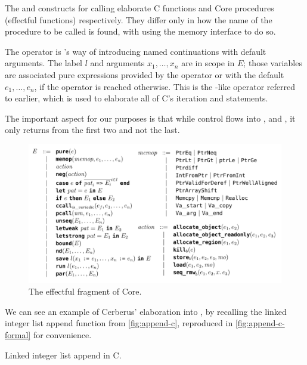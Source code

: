 The  and  constructs for calling %
elaborate C functions and Core procedures (effectful functions) respectively.
They differ only in how the name of the procedure to be called is found, with
 using the memory interface to do so. %

The  operator is 's way of introducing named %
continuations with default arguments. The label $l$ and arguments $x_1, \ldots,
x_n$ are in scope in $E$; those variables are associated pure expressions
provided by the  operator or with the default $e_1, \ldots, %
e_n$, if the operator is reached otherwise. This is the -like
operator referred to earlier, which is used to elaborate all of C's iteration
and  statements.

The important aspect for our purposes is that while control flows into
,  and , it %
only returns from the first two and not the last.

\begin{figure}[tp]
    \ContinuedFloat{}
    \includegraphics{figures/effectful-core.png}
    \caption{The effectful fragment of Core.}\label{fig:effectful-core-grammar}
\end{figure}

We can see an example of Cerberus' elaboration into , by recalling the
linked integer list append function from \cref{fig:append-c}, reproduced
in \cref{fig:append-c-formal} for convenience.

\begin{marginfigure}
    \centering
    \caption{Linked integer list append in C.}\label{fig:append-c-formal}
\end{marginfigure}%


